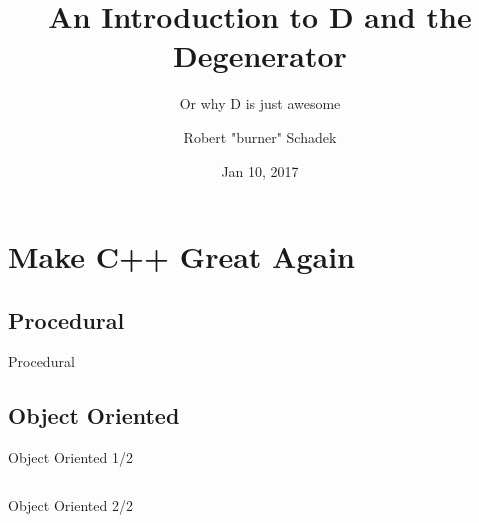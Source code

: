 \documentclass[xelatex,14pt]{beamer}
\title{An Introduction to D and the Degenerator}
\subtitle{Or why D is just awesome}
\author{Robert "burner" Schadek}
\date{Jan 10, 2017}
\begin{document}
\maketitle

\section{Make C++ Great Again}
\subsection{Procedural}
\begin{frame}{Procedural}

\end{frame}

\subsection{Object Oriented}
\begin{frame}{Object Oriented 1/2}
\begin{columns}[T]
\begin{column}{0.49\linewidth}

\end{column}
\begin{column}{0.49\linewidth}

\end{column}
\end{columns}
\end{frame}

\begin{frame}{Object Oriented 2/2}


\end{frame}
\end{document}
